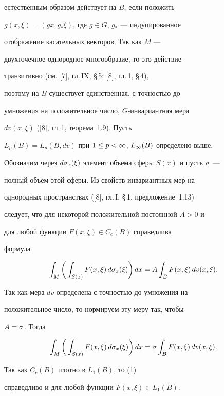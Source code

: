 естественным образом действует на $B$, если положить


$g(x,\xi)=(gx,g_*\xi)$, где $g\in G$, $g_*$ --- индуцированное


отображение касательных векторов. Так как $M$ ---


двухточечное однородное многообразие, то это действие


транзитивно (см. [7], гл.\,IX, \S\,5; [8], гл.\,1, \S\,4),


поэтому на $B$ существует единственная, с точностью до


умножения на положительное число, $G$-инвариантная мера


$dv(x,\xi)$ ([8], гл.\,1, теорема~1.9). Пусть


$L_p(B)=L_p(B,dv)$ при $1\le p<\infty$, $L_\infty(B)$ определено выше.





Обозначим через $d\sigma_x(\xi)$ элемент объема сферы $S(x)$ и пусть $\sigma$ ---


полный объем этой сферы. Из свойств инвариантных мер на


однородных пространствах ([8], гл.\,I, \S\,1, предложение~1.13)


следует, что для некоторой положительной постоянной $A>0$ и


для любой функции $F(x,\xi)\in C_c(B)$ справедлива


формула


$$


\int_M\bigg(\int_{S(x)} F(x,\xi)\,d\si_x(\xi)\bigg)\,dx=


A\int_B F(x,\xi)\,dv(x,\xi).


$$


Так как мера $dv$ определена с точностью до умножения на


положительное число, то нормируем эту меру так, чтобы


$A=\sigma$. Тогда


\begin{equation}


\int_M\bigg(\int_{S(x)} F(x,\xi)\,d\si_x(\xi)\bigg)\,dx=


\si\int_B F(x,\xi)\,dv(x,\xi).


\end{equation}


Так как $C_c(B)$ плотно в $L_1(B)$, то (1)


справедливо и для любой функции $F(x,\xi)\in L_1(B)$.





